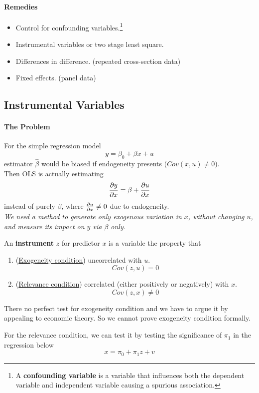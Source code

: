 \documentclass[]{article}
\begin{document}
			\paragraph{Remedies}
				\begin{itemize}
					\item Control for confounding variables.\footnote{A \textbf{confounding variable} is a variable that influences both the dependent variable and independent variable causing a spurious association.}
					\item Instrumental variables or two stage least square.
					\item Differences in difference. (repeated cross-section data)
					\item Fixed effects. (panel data)
				\end{itemize}
		\subsection{Instrumental Variables}
			\paragraph{The Problem} For the simple regression model
			\[
				y = \beta_0 + \beta x + u
			\]
			estimator $\hat{\beta}$ would be biased if endogeneity presents ($Cov(x, u) \neq 0$). \\
			Then OLS is actually estimating 
			\[
				\frac{\partial{y}}{\partial{x}} = \beta + \frac{\partial{u}}{\partial{x}}
			\]
			instead of purely $\beta$, where $\frac{\partial{u}}{\partial{x}} \neq 0$ due to endogeneity.\\
			\emph{We need a method to generate only exogenous variation in $x$, without changing $u$, and measure its impact on $y$ via $\beta$ only.}
			
			\begin{definition}
				An \textbf{instrument} $z$ for predictor $x$ is a variable the property that
				\begin{enumerate}
					\item (\ul{Exogeneity condition}) uncorrelated with $u$. \[ Cov(z,u) = 0\]
					\item (\ul{Relevance condition}) correlated (either positively or negatively) with $x$. \[Cov(z,x) \neq 0\]
				\end{enumerate}
			\end{definition}
			
			\begin{remark}
				There no perfect test for exogeneity condition and we have to argue it by appealing to economic theory. So we cannot prove exogeneity condition formally.
			\end{remark}
			\begin{remark}
				For the relevance condition, we can test it by testing the significance of $\pi_1$ in the regression below
					\[
						x = \pi_0 + \pi_1 z + v
					\]
			\end{remark}
\end{document}
